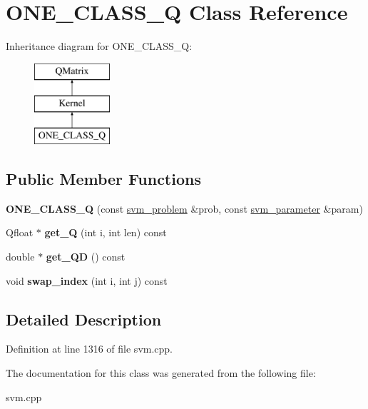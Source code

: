 \hypertarget{class_o_n_e___c_l_a_s_s___q}{
\section{ONE\_\-CLASS\_\-Q Class Reference}
\label{class_o_n_e___c_l_a_s_s___q}
}
Inheritance diagram for ONE\_\-CLASS\_\-Q:\begin{figure}[H]
\begin{center}
\leavevmode
\includegraphics[height=3cm]{class_o_n_e___c_l_a_s_s___q}
\end{center}
\end{figure}
\subsection*{Public Member Functions}
\begin{DoxyCompactItemize}
\item 
\hypertarget{class_o_n_e___c_l_a_s_s___q_a759ec4e3e00887ed848cf3f79ab7065f}{
{\bfseries ONE\_\-CLASS\_\-Q} (const \hyperlink{structsvm__problem}{svm\_\-problem} \&prob, const \hyperlink{structsvm__parameter}{svm\_\-parameter} \&param)}
\label{class_o_n_e___c_l_a_s_s___q_a759ec4e3e00887ed848cf3f79ab7065f}

\item 
\hypertarget{class_o_n_e___c_l_a_s_s___q_a1f8501234022e017cf46c4dfb2da9d31}{
Qfloat $\ast$ {\bfseries get\_\-Q} (int i, int len) const }
\label{class_o_n_e___c_l_a_s_s___q_a1f8501234022e017cf46c4dfb2da9d31}

\item 
\hypertarget{class_o_n_e___c_l_a_s_s___q_a882480d4370d8a89d667a28c3ed68a73}{
double $\ast$ {\bfseries get\_\-QD} () const }
\label{class_o_n_e___c_l_a_s_s___q_a882480d4370d8a89d667a28c3ed68a73}

\item 
\hypertarget{class_o_n_e___c_l_a_s_s___q_ad8bc86ca742c27d82718346388f83fad}{
void {\bfseries swap\_\-index} (int i, int j) const }
\label{class_o_n_e___c_l_a_s_s___q_ad8bc86ca742c27d82718346388f83fad}

\end{DoxyCompactItemize}


\subsection{Detailed Description}


Definition at line 1316 of file svm.cpp.



The documentation for this class was generated from the following file:\begin{DoxyCompactItemize}
\item 
svm.cpp\end{DoxyCompactItemize}

